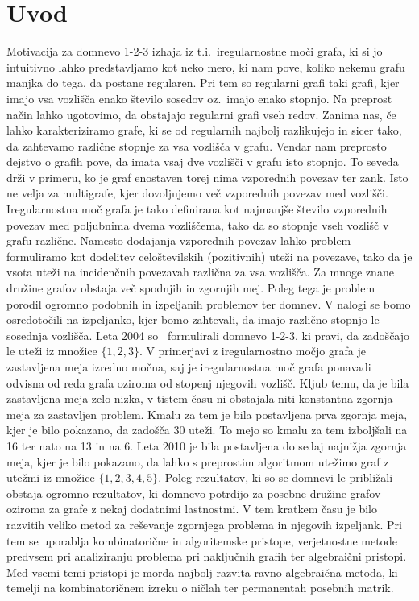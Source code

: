 \documentclass[12pt,a4paper,twoside]{article}
\theoremstyle{definition} %
\theoremstyle{plain} %
\numberwithin{equation}{section}  %
\begin{document}
\section{Uvod}
Motivacija za domnevo 1-2-3 izhaja iz t.i.\ iregularnostne moči grafa, ki si jo intuitivno lahko predstavljamo kot neko mero, ki nam pove, koliko nekemu grafu manjka do tega, da postane regularen. Pri tem so regularni grafi taki grafi, kjer imajo vsa vozlišča enako število sosedov oz.\ imajo enako stopnjo. Na preprost način lahko ugotovimo, da obstajajo regularni grafi vseh redov. Zanima nas, če lahko karakteriziramo grafe, ki se od regularnih najbolj razlikujejo in sicer tako, da zahtevamo različne stopnje za vsa vozlišča v grafu. Vendar nam preprosto dejstvo o grafih pove, da imata vsaj dve vozlišči v grafu isto stopnjo. To seveda drži v primeru, ko je graf enostaven torej nima vzporednih povezav ter zank. Isto ne velja za multigrafe, kjer dovoljujemo več vzporednih povezav med vozlišči. Iregularnostna moč grafa je tako definirana kot najmanjše število vzporednih povezav med poljubnima dvema vozliščema, tako da so stopnje vseh vozlišč v grafu različne.  Namesto dodajanja vzporednih povezav lahko problem formuliramo kot dodelitev celoštevilskih (pozitivnih) uteži na povezave, tako da je vsota uteži na incidenčnih povezavah različna za vsa vozlišča. Za mnoge znane družine grafov obstaja več spodnjih in zgornjih mej. Poleg tega je problem porodil ogromno podobnih in izpeljanih problemov ter domnev.  V nalogi se bomo osredotočili na izpeljanko, kjer bomo zahtevali, da imajo različno stopnjo le sosednja vozlišča.  Leta 2004 so~\citet{base} formulirali domnevo 1-2-3, ki pravi, da zadoščajo le uteži iz množice $\{1,2,3\}$. V primerjavi z iregularnostno močjo grafa je zastavljena meja izredno močna, saj je iregularnostna moč grafa ponavadi odvisna od reda grafa oziroma od stopenj njegovih vozlišč. Kljub temu, da je bila zastavljena meja zelo nizka, v tistem času ni obstajala niti konstantna zgornja meja za zastavljen problem. Kmalu za tem je bila postavljena prva zgornja meja, kjer je bilo pokazano, da zadošča 30 uteži. To mejo so kmalu za tem izboljšali na 16 ter nato na 13 in na 6. Leta 2010 je bila postavljena do sedaj najnižja zgornja meja, kjer je bilo pokazano, da lahko s preprostim algoritmom utežimo graf z utežmi iz množice $\{1,2,3,4,5\}$. Poleg rezultatov, ki so se domnevi le približali obstaja ogromno rezultatov, ki domnevo potrdijo za posebne družine grafov oziroma za grafe z nekaj dodatnimi lastnostmi.
V tem kratkem času je bilo razvitih veliko metod za reševanje zgornjega problema in njegovih izpeljank. Pri tem se uporablja kombinatorične in algoritemske pristope, verjetnostne metode predvsem pri analiziranju problema pri naključnih grafih ter algebraični pristopi. Med vsemi temi pristopi je morda najbolj razvita ravno algebraična metoda, ki temelji na kombinatoričnem izreku o ničlah ter permanentah posebnih matrik.
\end{document}
